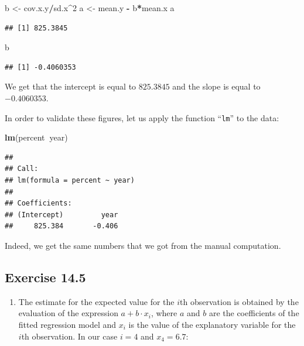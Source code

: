 \documentclass[
]{krantz}
\makeatletter
\newenvironment{Shaded}{\begin{snugshade}}{\end{snugshade}}
\newcommand{\DecValTok}[1]{\textcolor[rgb]{0.00,0.00,0.81}{#1}}
\newcommand{\KeywordTok}[1]{\textcolor[rgb]{0.13,0.29,0.53}{\textbf{#1}}}
\newcommand{\NormalTok}[1]{#1}
\newcommand{\OperatorTok}[1]{\textcolor[rgb]{0.81,0.36,0.00}{\textbf{#1}}}
\newcommand{\StringTok}[1]{\textcolor[rgb]{0.31,0.60,0.02}{#1}}
\providecommand{\tightlist}{%
  \setlength{\itemsep}{0pt}\setlength{\parskip}{0pt}}
\newenvironment{kframe}{%
\medskip{}
\setlength{\fboxsep}{.8em}
 \def\at@end@of@kframe{}%
 \ifinner\ifhmode%
  \def\at@end@of@kframe{\end{minipage}}%
  \begin{minipage}{\columnwidth}%
 \fi\fi%
 \def\FrameCommand##1{\hskip\@totalleftmargin \hskip-\fboxsep
 \colorbox{shadecolor}{##1}\hskip-\fboxsep
     \hskip-\linewidth \hskip-\@totalleftmargin \hskip\columnwidth}%
 \MakeFramed {\advance\hsize-\width
   \@totalleftmargin\z@ \linewidth\hsize
   \@setminipage}}%
 {\par\unskip\endMakeFramed%
 \at@end@of@kframe}
\renewenvironment{Shaded}{\begin{kframe}}{\end{kframe}}
\theoremstyle{definition}
\theoremstyle{definition}
\theoremstyle{definition}
\theoremstyle{remark}
\makeatother
\begin{document}
\begin{enumerate}
\begin{Shaded}
\begin{Highlighting}[]
\NormalTok{b <-}\StringTok{ }\NormalTok{cov.x.y}\OperatorTok{/}\NormalTok{sd.x}\OperatorTok{^}\DecValTok{2}
\NormalTok{a <-}\StringTok{ }\NormalTok{mean.y }\OperatorTok{-}\StringTok{ }\NormalTok{b}\OperatorTok{*}\NormalTok{mean.x}
\NormalTok{a}
\end{Highlighting}
\end{Shaded}

\begin{verbatim}
## [1] 825.3845
\end{verbatim}

\begin{Shaded}
\begin{Highlighting}[]
\NormalTok{b}
\end{Highlighting}
\end{Shaded}

\begin{verbatim}
## [1] -0.4060353
\end{verbatim}

  We get that the intercept is equal to \(825.3845\) and the slope is equal
  to \(-0.4060353\).

  In order to validate these figures, let us apply the function ``\texttt{lm}'' to
  the data:

\begin{Shaded}
\begin{Highlighting}[]
\KeywordTok{lm}\NormalTok{(percent}\OperatorTok{~}\NormalTok{year)}
\end{Highlighting}
\end{Shaded}

\begin{verbatim}
## 
## Call:
## lm(formula = percent ~ year)
## 
## Coefficients:
## (Intercept)         year  
##     825.384       -0.406
\end{verbatim}

  Indeed, we get the same numbers that we got from the manual computation.
\end{enumerate}

\hypertarget{exercise-14.5}{%
\subsection*{Exercise 14.5}\label{exercise-14.5}}


\begin{enumerate}
\def\labelenumi{\arabic{enumi}.}
\tightlist
\item
  The estimate for the expected
  value for the \(i\)th observation is obtained by the evaluation of the
  expression \(a + b\cdot x_i\), where \(a\) and \(b\) are the coefficients of
  the fitted regression model and \(x_i\) is the value of the explanatory
  variable for the \(i\)th observation. In our case \(i=4\) and \(x_4 = 6.7\):
\end{enumerate}
\end{document}
